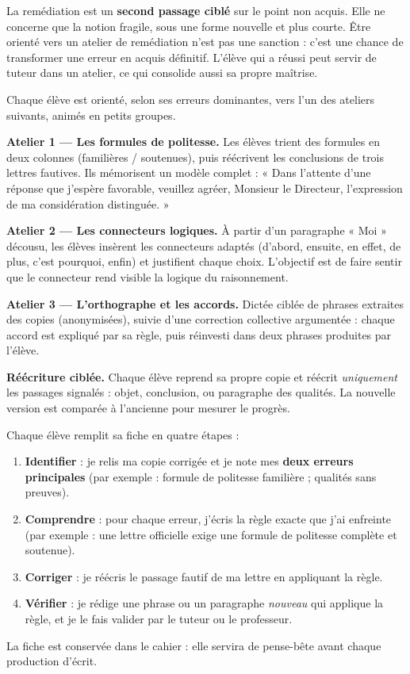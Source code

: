 \documentclass[11pt]{article}
\newcommand{\cle}[1]{{\popxbold\color{popdark}#1}}
\begin{document}
\begin{attention}
La \cle{remédiation} est un \textbf{second passage ciblé} sur le point non acquis. Elle ne concerne que la notion fragile, sous une forme nouvelle et plus courte. Être orienté vers un atelier de remédiation n'est pas une sanction : c'est une chance de transformer une erreur en acquis définitif. L'élève qui a réussi peut servir de tuteur dans un atelier, ce qui consolide aussi sa propre maîtrise.
\end{attention}

Chaque élève est orienté, selon ses erreurs dominantes, vers l'un des ateliers suivants, animés en petits groupes.

\textbf{Atelier 1 — Les formules de politesse.} Les élèves trient des formules en deux colonnes (familières / soutenues), puis réécrivent les conclusions de trois lettres fautives. Ils mémorisent un modèle complet : « Dans l'attente d'une réponse que j'espère favorable, veuillez agréer, Monsieur le Directeur, l'expression de ma considération distinguée. »

\textbf{Atelier 2 — Les connecteurs logiques.} À partir d'un paragraphe « Moi » décousu, les élèves insèrent les connecteurs adaptés (d'abord, ensuite, en effet, de plus, c'est pourquoi, enfin) et justifient chaque choix. L'objectif est de faire sentir que le connecteur rend visible la logique du raisonnement.

\textbf{Atelier 3 — L'orthographe et les accords.} Dictée ciblée de phrases extraites des copies (anonymisées), suivie d'une correction collective argumentée : chaque accord est expliqué par sa règle, puis réinvesti dans deux phrases produites par l'élève.

\textbf{Réécriture ciblée.} Chaque élève reprend sa propre copie et réécrit \emph{uniquement} les passages signalés : objet, conclusion, ou paragraphe des qualités. La nouvelle version est comparée à l'ancienne pour mesurer le progrès.

\begin{methode}
Chaque élève remplit sa fiche en quatre étapes :
\begin{enumerate}
\item \textbf{Identifier} : je relis ma copie corrigée et je note mes \textbf{deux erreurs principales} (par exemple : formule de politesse familière ; qualités sans preuves).
\item \textbf{Comprendre} : pour chaque erreur, j'écris la règle exacte que j'ai enfreinte (par exemple : une lettre officielle exige une formule de politesse complète et soutenue).
\item \textbf{Corriger} : je réécris le passage fautif de ma lettre en appliquant la règle.
\item \textbf{Vérifier} : je rédige une phrase ou un paragraphe \emph{nouveau} qui applique la règle, et je le fais valider par le tuteur ou le professeur.
\end{enumerate}
La fiche est conservée dans le cahier : elle servira de pense-bête avant chaque production d'écrit.
\end{methode}
\end{document}
